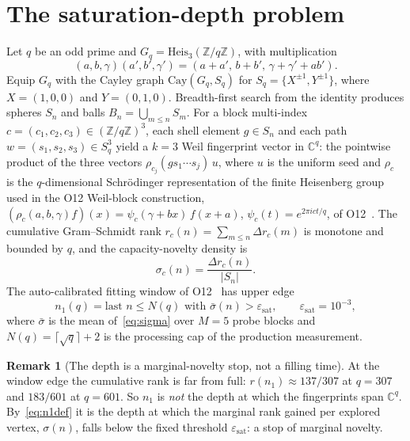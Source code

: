 \documentclass[11pt,a4paper]{article}
\theoremstyle{plain}
\theoremstyle{definition}
\newtheorem{remark}{Remark}
\newcommand{\Heis}{\mathrm{Heis}}
\newcommand{\Cay}{\mathrm{Cay}}
\newcommand{\epssat}{\varepsilon_{\mathrm{sat}}}
\newcommand{\none}{n_1}
\newcommand{\Fq}{\mathbb{Z}/q\mathbb{Z}}
\begin{document}
  \newpage
  \tableofcontents

  \newpage

  \section{The saturation-depth problem}
    \label{sec:problem}

    Let $q$ be an odd prime and $G_q = \Heis_3(\Fq)$, with multiplication
    \[
      (a,b,\gamma)(a',b',\gamma') = (a+a',\,b+b',\,\gamma+\gamma'+ab').
    \]
    Equip $G_q$ with the Cayley graph $\Cay(G_q,S_q)$ for
    $S_q = \{X^{\pm 1},Y^{\pm 1}\}$, where $X = (1,0,0)$ and $Y = (0,1,0)$.
    Breadth-first search from the identity produces spheres $S_n$ and balls
    $B_n = \bigcup_{m \le n} S_m$.
    For a block multi-index $c = (c_1, c_2, c_3) \in (\Fq)^3$, each shell element $g \in S_n$ and
    each path $w = (s_1, s_2, s_3) \in S_q^3$ yield a $k=3$ Weil fingerprint vector in
    $\mathbb{C}^q$: the pointwise product of the three vectors $\rho_{c_j}(g s_1 \cdots s_j)\,u$,
    where $u$ is the uniform seed and $\rho_c$ is the $q$-dimensional Schr\"{o}dinger
    representation of the finite Heisenberg group used in the O12 Weil-block construction,
    $(\rho_c(a,b,\gamma)f)(x) = \psi_c(\gamma + bx)\,f(x+a)$, $\psi_c(t) = e^{2\pi i c t/q}$, of
    O12~\cite{Beau2026a16}.
    The cumulative Gram--Schmidt rank $r_c(n) = \sum_{m \le n}\Delta r_c(m)$ is monotone and bounded
    by $q$, and the capacity-novelty density is
    \begin{equation}
      \sigma_c(n) = \frac{\Delta r_c(n)}{\lvert S_n\rvert}.
      \label{eq:sigma}
    \end{equation}
    The auto-calibrated fitting window of O12~\cite{Beau2026a16} has upper edge
    \begin{equation}
      \none(q) = \text{last } n \le N(q) \text{ with } \bar{\sigma}(n) > \epssat,
      \qquad \epssat = 10^{-3},
      \label{eq:n1def}
    \end{equation}
    where $\bar\sigma$ is the mean of~\eqref{eq:sigma} over $M = 5$ probe blocks and
    $N(q) = \lceil\sqrt{q}\rceil + 2$ is the processing cap of the production measurement.

    \begin{remark}[The depth is a marginal-novelty stop, not a filling time]
      \label{rem:marginal}
      At the window edge the cumulative rank is far from full: $r(\none) \approx 137/307$ at $q=307$
      and $183/601$ at $q=601$.
      So $\none$ is \emph{not} the depth at which the fingerprints span $\mathbb{C}^q$.
      By~\eqref{eq:n1def} it is the depth at which the marginal rank gained per explored vertex,
      $\sigma(n)$, falls below the fixed threshold $\epssat$: a stop of marginal novelty.
    \end{remark}
\end{document}
